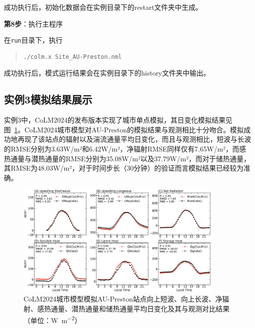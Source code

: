 成功执行后，初始化数据会在实例目录下的restart文件夹中生成。

\bigskip
\textbf{第8步}：执行主程序

在\texttt{run}目录下，执行
\begin{quote}
\begin{lstlisting}
./colm.x Site_AU-Preston.nml
\end{lstlisting}
\end{quote}

成功执行后，模式运行结果会在实例目录下的history文件夹中输出。



\subsection{实例3模拟结果展示}

实例3中，CoLM2024的发布版本实现了城市单点模拟，其日变化模拟结果见图~\ref{fig:fig_example03_au}。CoLM2024城市模型对AU-Preston的模拟结果与观测相比十分吻合。模拟成功地再现了该站点的辐射以及湍流通量平均日变化，而且与观测相比，短波与长波的RMSE分别为3.63W/m²和6.42W/m²，净辐射RMSE同样仅有7.65W/m²，而感热通量与潜热通量的RMSE分别为35.08W/m²以及37.79W/m²，而对于储热通量，其RMSE为48.03W/m²，对于时间步长（30分钟）的验证而言模拟结果已经较为准确。

\begin{figure}[htpb]
    \centering
    \includegraphics[width=0.90\textwidth]{figures/Example03_Site_AU-Preston.pdf}
    \caption{CoLM2024城市模型模拟AU-Preston站点向上短波、向上长波、净辐射、感热通量、潜热通量和储热通量平均日变化及其与观测对比结果（单位：\unit{W.m^{-2}}）}
    \label{fig:fig_example03_au}
\end{figure}

